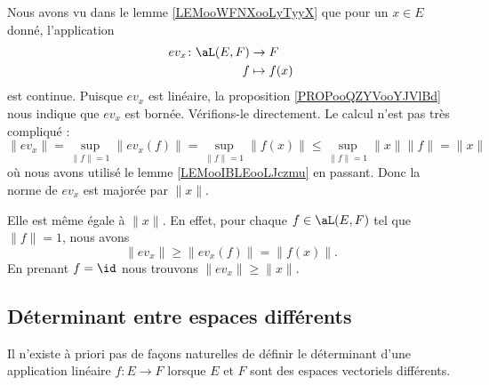 \begin{example}     \label{EXooTQPEooRRdddt}
	Nous avons vu dans le lemme \ref{LEMooWFNXooLyTyyX} que pour un \( x\in E\) donné, l'application
	\begin{equation}
		\begin{aligned}
			ev_x\colon \aL(E,F) & \to F        \\
			f                   & \mapsto f(x)
		\end{aligned}
	\end{equation}
	est continue. Puisque \( ev_x\) est linéaire, la proposition \ref{PROPooQZYVooYJVlBd} nous indique que \( ev_x\) est bornée. Vérifions-le directement. Le calcul n'est pas très compliqué :
	\begin{equation}
		\| ev_x \|=\sup_{\| f \|=1}\| ev_x(f) \|=\sup_{\| f \|=1}\| f(x) \|\leq \sup_{\| f \|=1}\| x \|\| f \|=\| x \|
	\end{equation}
	où nous avons utilisé le lemme \ref{LEMooIBLEooLJczmu} en passant. Donc la norme de \( ev_x\) est majorée par \( \| x \|\).

	Elle est même égale à \( \| x \|\). En effet, pour chaque \( f\in \aL(E,F)\) tel que \(  \| f \|=1\), nous avons
	\begin{equation}
		\| ev_x \|\geq \| ev_x(f) \|=\| f(x) \|.
	\end{equation}
	En prenant \( f=\id\) nous trouvons \(  \| ev_x \|\geq \| x \|  \).
\end{example}


\subsection{Déterminant entre espaces différents}

Il n'existe à priori pas de façons naturelles de définir le déterminant d'une application linéaire \(f \colon E\to F  \) lorsque \( E\) et \( F\) sont des espaces vectoriels différents\cite{BIBooJLVVooEdGshG}.

